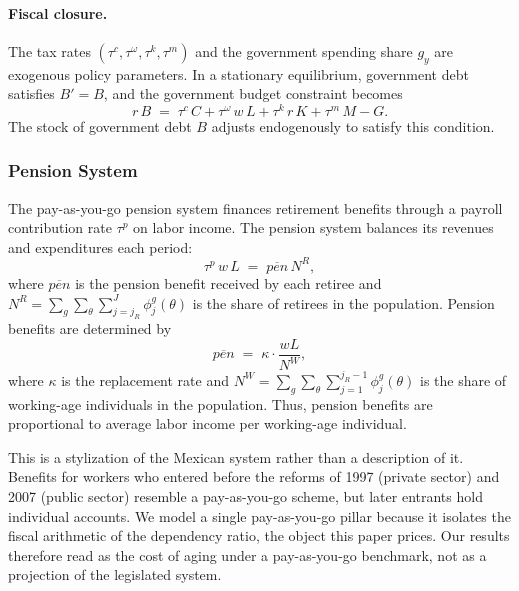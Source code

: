 \documentclass[12pt,a4paper]{article}
\begin{document}
\paragraph{Fiscal closure.}
The tax rates $(\tau^c, \tau^\omega, \tau^k, \tau^m)$ and the government spending share $g_y$ are exogenous policy parameters. In a stationary equilibrium, government debt satisfies $B'=B$, and the government budget constraint becomes
\begin{equation}
\label{eq:gov_stationary}
r\, B \;=\; \tau^c\, C + \tau^\omega\, w\, L + \tau^k\, r\, K + \tau^m\, M - G.
\end{equation}
The stock of government debt $B$ adjusts endogenously to satisfy this condition.


\subsubsection{Pension System}
\label{subsubsec:pension}

The pay-as-you-go pension system finances retirement benefits through a payroll contribution rate $\tau^p$ on labor income. The pension system balances its revenues and expenditures each period:
\begin{equation}
\label{eq:pension_balance}
\tau^p\, w\, L \;=\; \overline{pen}\, N^R,
\end{equation}
where $\overline{pen}$ is the pension benefit received by each retiree and $N^R = \sum_g \sum_\theta \sum_{j=j_R}^{J} \phi_j^{g}(\theta)$ is the share of retirees in the population. Pension benefits are determined by
\begin{equation}
\label{eq:pension_benefit}
\overline{pen} \;=\; \kappa \cdot \frac{w L}{N^W},
\end{equation}
where $\kappa$ is the replacement rate and $N^W = \sum_g \sum_\theta \sum_{j=1}^{j_R - 1} \phi_j^{g}(\theta)$ is the share of working-age individuals in the population. Thus, pension benefits are proportional to average labor income per working-age individual.

This is a stylization of the Mexican system rather than a description of it. Benefits for workers who entered before the reforms of 1997 (private sector) and 2007 (public sector) resemble a pay-as-you-go scheme, but later entrants hold individual accounts. We model a single pay-as-you-go pillar because it isolates the fiscal arithmetic of the dependency ratio, the object this paper prices. Our results therefore read as the cost of aging under a pay-as-you-go benchmark, not as a projection of the legislated system.
\end{document}
